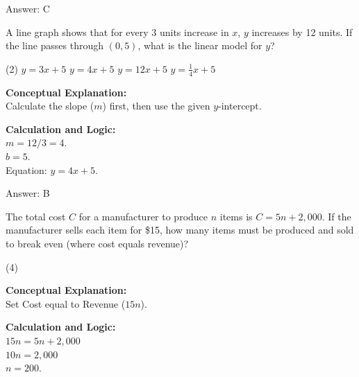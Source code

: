 \documentclass[11pt,paper=a4,answers]{exam}
\begin{document}
\begin{questions}
\begin{solution}
\vspace{15pt}
Answer: \colorbox{yellow!100}{C}
\end{solution}

\vspace{20pt}

\question
A line graph shows that for every 3 units increase in $x$, $y$ increases by 12 units. If the line passes through $(0, 5)$, what is the linear model for $y$?
\begin{tasks}(2)
    \task $y = 3x + 5$
    \task $y = 4x + 5$
    \task $y = 12x + 5$
    \task $y = \frac{1}{4}x + 5$
\end{tasks}

\begin{solution}
\textbf{Conceptual Explanation:} \\
Calculate the slope ($m$) first, then use the given $y$-intercept.

\vspace{10pt}
\textbf{Calculation and Logic:} \\
$m = 12 / 3 = 4$. \\
$b = 5$. \\
Equation: $y = 4x + 5$.

\vspace{15pt}
Answer: \colorbox{yellow!100}{B}
\end{solution}

\vspace{20pt}

\question
The total cost $C$ for a manufacturer to produce $n$ items is $C = 5n + 2,000$. If the manufacturer sells each item for \$15, how many items must be produced and sold to break even (where cost equals revenue)?
\begin{tasks}(4)
\end{tasks}

\begin{solution}
\textbf{Conceptual Explanation:} \\
Set Cost equal to Revenue ($15n$).

\vspace{10pt}
\textbf{Calculation and Logic:} \\
$15n = 5n + 2,000$ \\
$10n = 2,000$ \\
$n = 200$.


\end{solution}
\end{questions}
\end{document}
